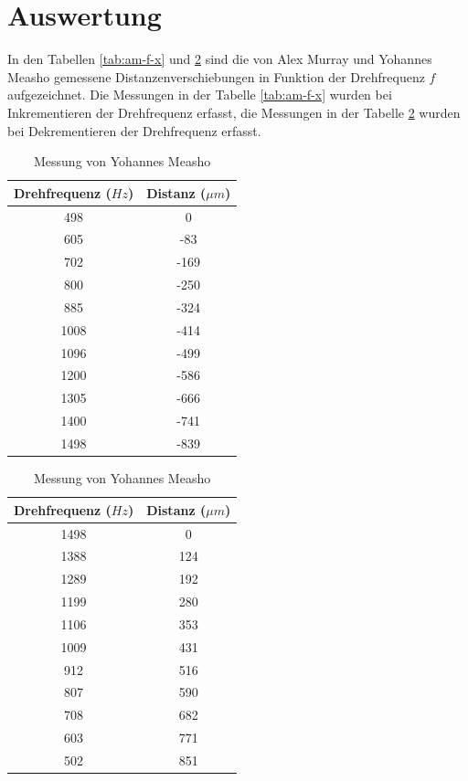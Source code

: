 \section{Auswertung}

In den Tabellen \ref{tab:am-f-x} und  \ref{tab:ym-f-x}  sind die von Alex Murray
und   Yohannes   Measho   gemessene  Distanzenverschiebungen  in  Funktion   der
Drehfrequenz  $f$  aufgezeichnet.  Die Messungen in der Tabelle \ref{tab:am-f-x}
wurden bei Inkrementieren der Drehfrequenz erfasst, die Messungen in der Tabelle
\ref{tab:ym-f-x}   wurden   bei   Dekrementieren   der   Drehfrequenz   erfasst.

\begin{table}[H]
    \caption{Distanzmessungen bei Inkrementieren und Dekrementieren der Drehfrequenz}
    \begin{subtable}{.5\linewidth}
        \centering
        \caption{Messung von Alex Murray}
        \label{tab:am-f-x}
        \begin{tabular}{cc}
            \toprule
            Drehfrequenz ($Hz$) & Distanz ($\mu m$) \\
            \midrule
            498  & 0    \\
            605  & -83  \\
            702  & -169 \\
            800  & -250 \\
            885  & -324 \\
            1008 & -414 \\
            1096 & -499 \\
            1200 & -586 \\
            1305 & -666 \\
            1400 & -741 \\
            1498 & -839 \\
            \bottomrule
        \end{tabular}
    \end{subtable}
    \begin{subtable}{.5\linewidth}
        \centering
        \caption{Messung von Yohannes Measho}
        \label{tab:ym-f-x}
        \begin{tabular}{cc}
            \toprule
            Drehfrequenz ($Hz$) & Distanz ($\mu m$) \\
            \midrule
            1498 & 0   \\
            1388 & 124 \\
            1289 & 192 \\
            1199 & 280 \\
            1106 & 353 \\
            1009 & 431 \\
            912  & 516 \\
            807  & 590 \\
            708  & 682 \\
            603  & 771 \\
            502  & 851 \\
            \bottomrule
        \end{tabular}
    \end{subtable}
\end{table}

